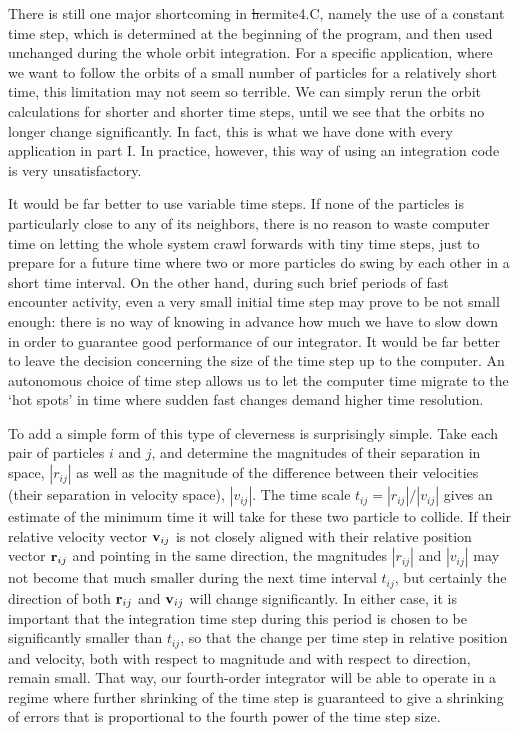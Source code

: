 There is still one major shortcoming in {\st hermite4.C}, namely the
use of a constant time step, which is determined at the beginning of
the program, and then used unchanged during the whole orbit integration.
For a specific application, where we want to follow the orbits of a
small number of particles for a relatively short time, this limitation
may not seem so terrible.  We can simply rerun the orbit calculations
for shorter and shorter time steps, until we see that the orbits no
longer change significantly.  In fact, this is what we have done with
every application in part I.  In practice, however, this way of using
an integration code is very unsatisfactory.

It would be far better to use variable time steps.  If none of the
particles is particularly close to any of its neighbors, there is no
reason to waste computer time on letting the whole system crawl
forwards with tiny time steps, just to prepare for a future time where
two or more particles do swing by each other in a short time interval.
On the other hand, during such brief periods of fast encounter activity,
even a very small initial time step may prove to be not small enough:
there is no way of knowing in advance how much we have to slow down in
order to guarantee good performance of our integrator.  It would be
far better to leave the decision concerning the size of the time step
up to the computer.  An autonomous choice of time step allows us to
let the computer time migrate to the `hot spots' in time where sudden
fast changes demand higher time resolution.

To add a simple form of this type of cleverness is surprisingly simple.
Take each pair of particles $i$ and $j$, and determine the magnitudes
of their separation in space, $|r_{ij}|$ as well as the magnitude of
the difference between their velocities (their separation in velocity
space), $|v_{ij}|$.  The time scale $t_{ij} = |r_{ij}|/|v_{ij}|$ gives
an estimate of the minimum time it will take for these two particle to
collide.  If their relative velocity vector ${\bf v}_{ij}$ is not closely
aligned with their relative position vector ${\bf r}_{ij}$ and pointing in
the same direction, the magnitudes $|r_{ij}|$ and $|v_{ij}|$ may not
become that much smaller during the next time interval $t_{ij}$, but
certainly the direction of both ${\bf r}_{ij}$ and ${\bf v}_{ij}$ will change
significantly.  In either case, it is important that the integration
time step during this period is chosen to be significantly smaller than
$t_{ij}$, so that the change per time step in relative position and
velocity, both with respect to magnitude and with respect to direction,
remain small.  That way, our fourth-order integrator will be able to
operate in a regime where further shrinking of the time step is
guaranteed to give a shrinking of errors that is proportional
to the fourth power of the time step size.

